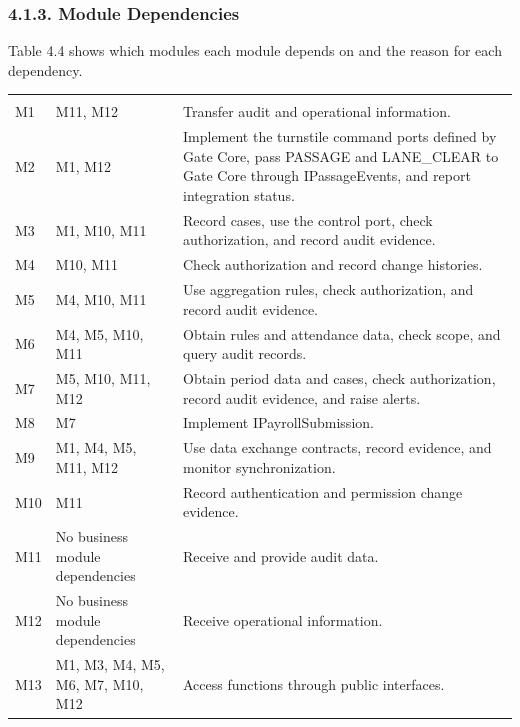 \subsubsection*{4.1.3. Module Dependencies}

{}


Table 4.4 shows which modules each module depends on and the reason for each dependency.

\begin{longtable}{|>{\raggedright\arraybackslash}p{45.5pt}|>{\raggedright\arraybackslash}p{100.5pt}|>{\raggedright\arraybackslash}p{263.5pt}|}
\hline
\multicolumn{1}{|>{\columncolor{tableheader}\centering\arraybackslash}p{45.5pt}|}{\textbf{Module}} & \multicolumn{1}{>{\columncolor{tableheader}\centering\arraybackslash}p{100.5pt}|}{\textbf{Depends On}} & \multicolumn{1}{>{\columncolor{tableheader}\centering\arraybackslash}p{263.5pt}|}{\textbf{Purpose}} \\
\hline
\endhead
\multicolumn{3}{c}{\rule{0pt}{20pt}\normalsize\textbf{Table 4.4. Module Dependencies}} \\
\endlastfoot
M1 & M11, M12 & Transfer audit and operational information. \\
\hline
M2 & M1, M12 & Implement the turnstile command ports defined by Gate Core, pass PASSAGE and LANE\_CLEAR to Gate Core through IPassageEvents, and report integration status. \\
\hline
M3 & M1, M10, M11 & Record cases, use the control port, check authorization, and record audit evidence. \\
\hline
M4 & M10, M11 & Check authorization and record change histories. \\
\hline
M5 & M4, M10, M11 & Use aggregation rules, check authorization, and record audit evidence. \\
\hline
M6 & M4, M5, M10, M11 & Obtain rules and attendance data, check scope, and query audit records. \\
\hline
M7 & M5, M10, M11, M12 & Obtain period data and cases, check authorization, record audit evidence, and raise alerts. \\
\hline
M8 & M7 & Implement IPayrollSubmission. \\
\hline
M9 & M1, M4, M5, M11, M12 & Use data exchange contracts, record evidence, and monitor synchronization. \\
\hline
M10 & M11 & Record authentication and permission change evidence. \\
\hline
M11 & No business module dependencies & Receive and provide audit data. \\
\hline
M12 & No business module dependencies & Receive operational information. \\*
\hline\noalign{\nobreak}
M13 & M1, M3, M4, M5, M6, M7, M10, M12 & Access functions through public interfaces. \\
\hline
\end{longtable}



